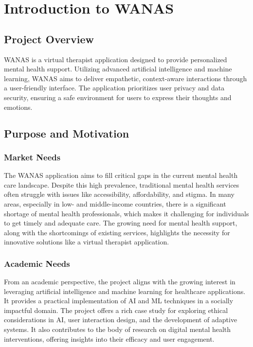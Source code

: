 \section{Introduction to WANAS}

\subsection{Project Overview}
WANAS is a virtual therapist application designed to provide personalized mental health support. Utilizing advanced artificial intelligence and machine learning, WANAS aims to deliver empathetic, context-aware interactions through a user-friendly interface. The application prioritizes user privacy and data security, ensuring a safe environment for users to express their thoughts and emotions.

\subsection{Purpose and Motivation}

\subsubsection{Market Needs}
The WANAS application aims to fill critical gaps in the current mental health care landscape. Despite this high prevalence, traditional mental health services often struggle with issues like accessibility, affordability, and stigma. In many areas, especially in low- and middle-income countries, there is a significant shortage of mental health professionals, which makes it challenging for individuals to get timely and adequate care. The growing need for mental health support, along with the shortcomings of existing services, highlights the necessity for innovative solutions like a virtual therapist application.

\subsubsection{Academic Needs}
From an academic perspective, the project aligns with the growing interest in leveraging artificial intelligence and machine learning for healthcare applications. It provides a practical implementation of AI and ML techniques in a socially impactful domain. The project offers a rich case study for exploring ethical considerations in AI, user interaction design, and the development of adaptive systems. It also contributes to the body of research on digital mental health interventions, offering insights into their efficacy and user engagement.

